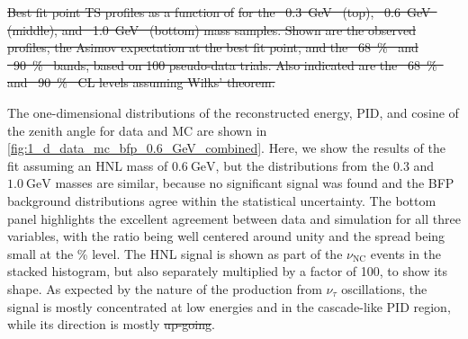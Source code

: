 \documentclass[
    aps,
    prd,
    reprint,
    amsmath,
    amssymb,
    nofootinbib,
    superscriptaddress,
    floatfix
]{revtex4-2}
\newcommand{\gev}{\giga\electronvolt}
\def\ut4{$|U_{\tau4}|^2$}
\providecommand{\DIFaddtex}[1]{{\protect\color{blue}\uwave{#1}}} %
\providecommand{\DIFdeltex}[1]{{\protect\color{red}\sout{#1}}}                      %
\providecommand{\DIFaddbegin}{} %
\providecommand{\DIFaddend}{} %
\providecommand{\DIFdelbegin}{} %
\providecommand{\DIFdelend}{} %
\providecommand{\DIFdelFL}[1]{\DIFdel{#1}} %
\providecommand{\DIFadd}[1]{\texorpdfstring{\DIFaddtex{#1}}{#1}} %
\providecommand{\DIFdel}[1]{\texorpdfstring{\DIFdeltex{#1}}{}} %
\newcommand{\DIFscaledelfig}{0.5}
\newlength{\DIFdelgraphicswidth} %
\newlength{\DIFdelgraphicsheight} %
\newcommand{\DIFaddincludegraphics}[2][]{{\color{blue}\fbox{\DIFOincludegraphics[#1]{#2}}}} %
\newcommand{\DIFdelincludegraphics}[2][]{%
\sbox{\DIFdelgraphicsbox}{\DIFOincludegraphics[#1]{#2}}%
\settoboxwidth{\DIFdelgraphicswidth}{\DIFdelgraphicsbox} %
\settoboxtotalheight{\DIFdelgraphicsheight}{\DIFdelgraphicsbox} %
\scalebox{\DIFscaledelfig}{%
\parbox[b]{\DIFdelgraphicswidth}{\usebox{\DIFdelgraphicsbox}\\[-\baselineskip] \rule{\DIFdelgraphicswidth}{0em}}\llap{\resizebox{\DIFdelgraphicswidth}{\DIFdelgraphicsheight}{%
\setlength{\unitlength}{\DIFdelgraphicswidth}%
\begin{picture}(1,1)%
\thicklines\linethickness{2pt} %
{\color[rgb]{1,0,0}\put(0,0){\framebox(1,1){}}}%
{\color[rgb]{1,0,0}\put(0,0){\line( 1,1){1}}}%
{\color[rgb]{1,0,0}\put(0,1){\line(1,-1){1}}}%
\end{picture}%
}\hspace*{3pt}}} %
} %
\DeclareRobustCommand{\DIFaddbegin}{\DIFOaddbegin \let\includegraphics\DIFaddincludegraphics} %
\DeclareRobustCommand{\DIFaddend}{\DIFOaddend \let\includegraphics\DIFOincludegraphics} %
\DeclareRobustCommand{\DIFdelbegin}{\DIFOdelbegin \let\includegraphics\DIFdelincludegraphics} %
\DeclareRobustCommand{\DIFdelend}{\DIFOaddend \let\includegraphics\DIFOincludegraphics} %
\begin{document}
\DIFdelbegin %
{%
\DIFdelFL{Best fit point TS profiles as a function of }%
\DIFdelFL{for the \mbox{%
\SI{0.3}{\gev} }\hspace{0pt}%
(top), \mbox{%
\SI{0.6}{\gev} }\hspace{0pt}%
(middle), and \mbox{%
\SI{1.0}{\gev} }\hspace{0pt}%
(bottom) mass samples. Shown are the observed profiles, the Asimov expectation at the best fit point, and the \mbox{%
\SI{68}{\percent} }\hspace{0pt}%
and \mbox{%
\SI{90}{\percent} }\hspace{0pt}%
bands, based on 100 pseudo-data trials. Also indicated are the \mbox{%
\SI{68}{\percent} }\hspace{0pt}%
and \mbox{%
\SI{90}{\percent} }\hspace{0pt}%
CL levels assuming Wilks' theorem.}}

\DIFdelend The one-dimensional distributions of the reconstructed energy, PID, and cosine of the zenith angle for data and MC are shown in \cref{fig:1_d_data_mc_bfp_0.6_GeV_combined}.
Here, we show the results of the fit assuming an HNL mass of $\SI{0.6}\GeV$, but the distributions from the 0.3 and $\SI{1.0}\GeV$ masses are similar, because no significant signal was found and the BFP background distributions agree within the statistical uncertainty.
The bottom panel highlights the excellent agreement between data and simulation for all three variables, with the ratio being well centered around unity and the spread being small at the \si{\percent} level.
The HNL signal is shown as part of the $\nu_\mathrm{NC}$ events in the stacked histogram, but also separately multiplied by a factor of 100, to show its shape.
As expected by the nature of the production from $\nu_\tau$ oscillations, the signal is mostly concentrated at low energies and in the cascade-like PID region, while its direction is mostly \DIFdelbegin \DIFdel{up-going}\DIFdelend \DIFaddbegin \DIFadd{upward-going}\DIFaddend .
\end{document}
